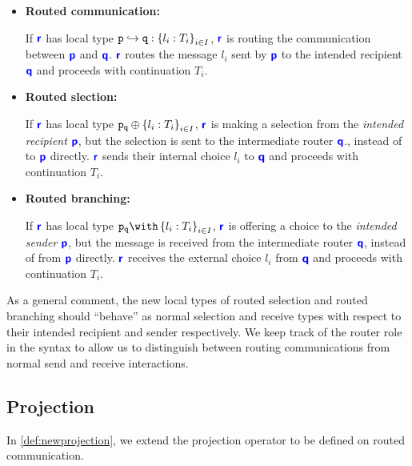 \begin{itemize}

\item \textbf{Routed communication:}

If ${\color{blue}\bm{\mathsf{r}}}$ has local type ${\mathtt{p}} \hookrightarrow {\mathtt{q}}: \left\{{l_i: T_i}\right\}_{i \in I}$,
${\color{blue}\bm{\mathsf{r}}}$ is routing the communication between 
${\color{blue}\bm{\mathsf{p}}}$ and ${\color{blue}\bm{\mathsf{q}}}$.
${\color{blue}\bm{\mathsf{r}}}$ routes the message $l_i$ sent by ${\color{blue}\bm{\mathsf{p}}}$
to the intended recipient ${\color{blue}\bm{\mathsf{q}}}$ and proceeds 
with continuation $T_i$.

\item \textbf{Routed slection:}

If ${\color{blue}\bm{\mathsf{r}}}$ has local type ${\mathtt{{\mathtt{p}}_{{\mathtt{q}}}}} \oplus \left\{ {l_i: T_i} \right\}_{i \in I}$,
${\color{blue}\bm{\mathsf{r}}}$ is making a selection from the
\textit{intended recipient} ${\color{blue}\bm{\mathsf{p}}}$,
but the selection is sent to the intermediate router ${\color{blue}\bm{\mathsf{q}}}$.,
instead of to ${\color{blue}\bm{\mathsf{p}}}$ directly.
${\color{blue}\bm{\mathsf{r}}}$ sends their internal choice $l_i$ to ${\color{blue}\bm{\mathsf{q}}}$
and proceeds with continuation $T_i$.

\item \textbf{Routed branching:}

If ${\color{blue}\bm{\mathsf{r}}}$ has local type $\tbraproxy{p}{q}{l_i: T_i}{i \in I}$,
${\color{blue}\bm{\mathsf{r}}}$ is offering a choice to the
\textit{intended sender} ${\color{blue}\bm{\mathsf{p}}}$,
but the message is received from the intermediate router ${\color{blue}\bm{\mathsf{q}}}$,
instead of from ${\color{blue}\bm{\mathsf{p}}}$ directly.
${\color{blue}\bm{\mathsf{r}}}$ receives the external choice $l_i$ from ${\color{blue}\bm{\mathsf{q}}}$
and proceeds with continuation $T_i$.

\end{itemize}

As a general comment, the new local types of routed selection
and routed branching should ``behave'' as normal selection and
receive types with respect to their intended recipient and sender
respectively. We keep track of the router role in the syntax
to allow us to distinguish between routing communications
from normal send and receive interactions.

\subsection{Projection}
\label{subsection:newprojection}

In \cref{def:newprojection},
we extend the projection operator
to be defined
on routed communication.

